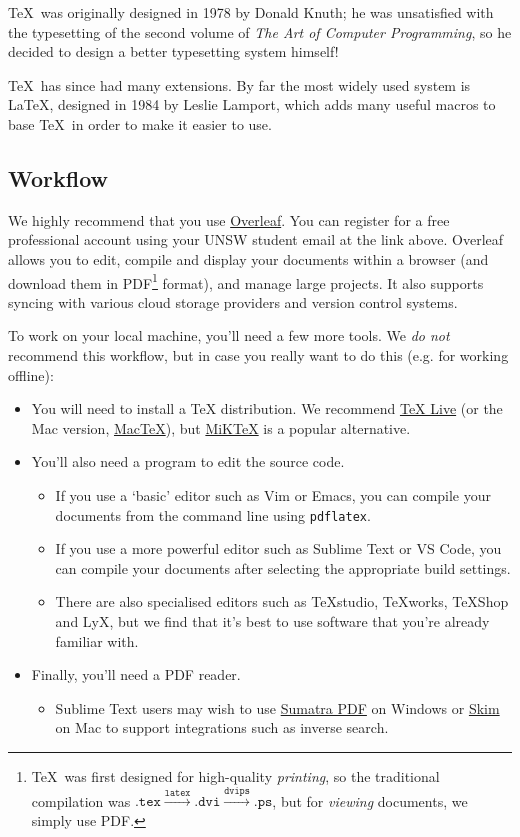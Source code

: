 \documentclass[12pt]{article}
\begin{document}
\TeX\ was originally designed in 1978 by Donald Knuth; he was unsatisfied with the typesetting of the second volume of \textit{The Art of Computer Programming}, so he decided to design a better typesetting system himself!

\TeX\ has since had many extensions. By far the most widely used system is \LaTeX, designed in 1984 by Leslie Lamport, which adds many useful macros to base \TeX\ in order to make it easier to use.

\subsection*{Workflow}

We highly recommend that you use \href{https://www.overleaf.com/sso-login}{Overleaf}. You can register for a free professional account using your UNSW student email at the link above. Overleaf allows you to edit, compile and display your documents within a browser (and download them in PDF\footnote{\TeX\ was first designed for high-quality \emph{printing}, so the traditional compilation was $\texttt{.tex} \xrightarrow{\texttt{latex}} \texttt{.dvi} \xrightarrow{\texttt{dvips}} \texttt{.ps}$, but for \emph{viewing} documents, we simply use PDF.} format), and manage large projects. It also supports syncing with various cloud storage providers and version control systems.

To work on your local machine, you'll need a few more tools. We \emph{do not} recommend this workflow, but in case you really want to do this (e.g. for working offline):
\begin{itemize}
    \item You will need to install a TeX distribution. We recommend \href{https://tug.org/texlive/}{TeX Live} (or the Mac version, \href{https://tug.org/mactex}{MacTeX}), but \href{https://miktex.org}{MiKTeX} is a popular alternative.
    \item You'll also need a program to edit the source code.
    \begin{itemize}
        \item If you use a `basic' editor such as Vim or Emacs, you can compile your documents from the command line using \texttt{pdflatex}.
        \item If you use a more powerful editor such as Sublime Text or VS Code, you can compile your documents after selecting the appropriate build settings.
        \item There are also specialised editors such as TeXstudio, TeXworks, TeXShop and LyX, but we find that it's best to use software that you're already familiar with.
    \end{itemize}
    \item Finally, you'll need a PDF reader.
    \begin{itemize}
        \item Sublime Text users may wish to use \href{https://www.sumatrapdfreader.org/free-pdf-reader}{Sumatra PDF} on Windows or \href{https://skim-app.sourceforge.io/}{Skim} on Mac to support integrations such as inverse search.
    \end{itemize}
\end{itemize}
\end{document}
